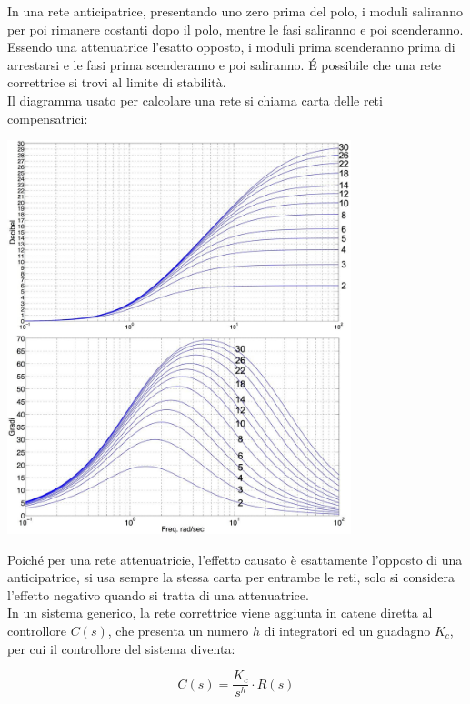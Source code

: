 \documentclass{article}
\numberwithin{equation}{subsection}
\begin{document}
In una rete anticipatrice, presentando uno zero prima del polo, i moduli saliranno per poi rimanere costanti dopo il polo, mentre le fasi saliranno e poi scenderanno. Essendo 
una attenuatrice l'esatto opposto, i moduli prima scenderanno prima di arrestarsi e le fasi prima scenderanno e poi saliranno. 
\'{E} possibile che una rete correttrice si trovi al limite di stabilità. \\

Il diagramma usato per calcolare una rete si chiama carta delle reti compensatrici: 

\begin{center}
    \includegraphics[width=10cm]{CartaReti.jpg}
\end{center}

Poiché per una rete attenuatricie, l'effetto causato è esattamente l'opposto di una anticipatrice, si usa sempre la stessa carta per entrambe le reti, solo si considera 
l'effetto negativo quando si tratta di una attenuatrice. \\

In un sistema generico, la rete correttrice viene aggiunta in catene diretta al controllore $C(s)$, che presenta un numero $h$ di integratori ed un guadagno $K_c$, per cui 
il controllore del sistema diventa: 

\begin{equation}
    C(s)=\displaystyle\frac{K_c}{s^h}\cdot R(s)
\end{equation}
\end{document}
